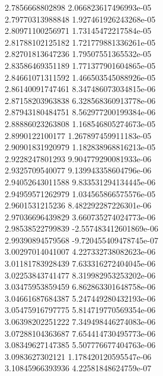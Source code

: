{2.7856668802898 2.066823617496993e-05 \\
2.79770313988848 1.927461926243268e-05 \\
2.80971100256971 1.73145472217584e-05 \\
2.81788102125182 1.721779881336261e-05 \\
2.82701813647236 1.79507551365532e-05 \\
2.83586469351189 1.771377901604865e-05 \\
2.84661071311592 1.466503545088926e-05 \\
2.86140091747461 8.347486073034815e-06 \\
2.87158203963838 6.328568360913778e-06 \\
2.87943180484751 8.562977200199384e-06 \\
2.88886023263808 1.168546805274673e-05 \\
2.8990122100177 1.267897459911183e-05 \\
2.90901831920979 1.182838968816213e-05 \\
2.9228247801293 9.904779290081933e-06 \\
2.9325709540077 9.139943358604796e-06 \\
2.94052643011588 9.833531294134445e-06 \\
2.94959571262979 1.034565866575576e-05 \\
2.9601531215236 8.482292287226301e-06 \\
2.97036696439829 3.660735274024773e-06 \\
2.98538522799839 -2.557483412601869e-06 \\
2.99390894579568 -9.720455409478745e-07 \\
3.00297014041007 4.227332738082623e-06 \\
3.01181783928439 7.633316272404045e-06 \\
3.02253843741477 8.319982953253202e-06 \\
3.03475953859459 6.862863301648758e-06 \\
3.04661687684387 5.247449280432193e-06 \\
3.05475916797775 5.814719770569354e-06 \\
3.06398202251222 7.349498446274083e-06 \\
3.07288104363687 7.654414730495773e-06 \\
3.08349627147385 5.507776677404763e-06 \\
3.0983627302121 1.178420120595547e-06 \\
3.10845966393936 4.22581848624759e-07 \\
}
